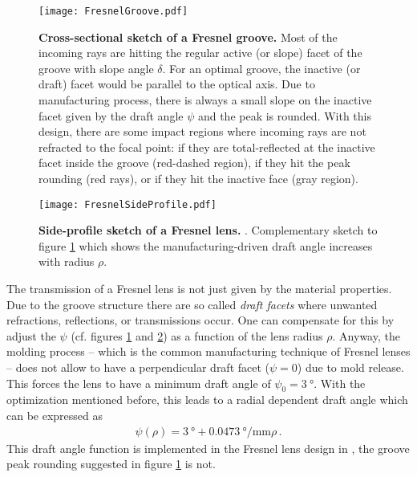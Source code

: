 \begin{figure}[H]
	\centering
	\texttt{[image: FresnelGroove.pdf]}
	\caption[Fresnel groove]{\textbf{Cross-sectional sketch of a Fresnel groove.} \cite{famous:eichler} Most of the incoming rays are hitting the regular active (or slope) facet of the groove with slope angle $\delta$. For an optimal groove, the inactive (or draft) facet would be parallel to the optical axis. Due to manufacturing process, there is always a small slope on the inactive facet given by the draft angle $\psi$ and the peak is rounded. With this design, there are some impact regions where incoming rays are not refracted to the focal point: if they are total-reflected at the inactive facet inside the groove (red-dashed region), if they hit the peak rounding (red rays), or if they hit the inactive face (gray region).}
	\label{iceact:model:fresnelgroove}	
\end{figure}

\begin{figure}[H]
	\centering
	\texttt{[image: FresnelSideProfile.pdf]}
	\caption[Fresnel side-profile]{\textbf{Side-profile sketch of a Fresnel lens.} \cite[adapted]{iceact:fresnellens:design}. Complementary sketch to figure \ref{iceact:model:fresnelgroove} which shows the manufacturing-driven draft angle increases with radius $\rho$.}
	\label{iceact:model:fresnelprofile}	
\end{figure}

The transmission of a Fresnel lens is not just given by the material properties. Due to the groove structure there are so called \textit{draft facets} where unwanted refractions, reflections, or transmissions occur. One can compensate for this by adjust the  $\psi$ (cf. figures \ref{iceact:model:fresnelgroove} and \ref{iceact:model:fresnelprofile}) as a function of the lens radius $\rho$. Anyway, the molding process -- which is the common manufacturing technique of Fresnel lenses -- does not allow to have a perpendicular draft facet ($\psi = 0$) due to mold release. This forces the lens to have a minimum draft angle of $\psi_0 = \SI{3}{\degree}$. With the optimization mentioned before, this leads to a radial dependent draft angle which can be expressed as \cite{famous:eichler, famous:niggemann}
\begin{align}
	\psi(\rho) = \SI{3}{\degree} + \SI{0.0473}{\degree\per\milli\meter}\rho\,.
\end{align}
This draft angle function is implemented in the Fresnel lens design in \geant, the groove peak rounding suggested in figure \ref{iceact:model:fresnelgroove} is not.

